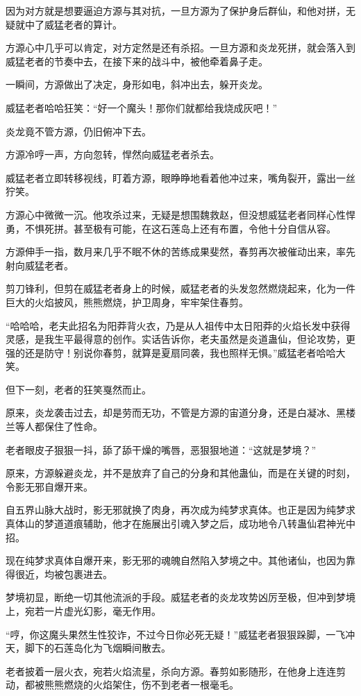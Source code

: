 \begin{this_body}
因为对方就是想要逼迫方源与其对抗，一旦方源为了保护身后群仙，和他对拼，无疑就中了威猛老者的算计。

方源心中几乎可以肯定，对方定然是还有杀招。一旦方源和炎龙死拼，就会落入到威猛老者的节奏中去，在接下来的战斗中，被他牵着鼻子走。

一瞬间，方源做出了决定，身形如电，斜冲出去，躲开炎龙。

威猛老者哈哈狂笑：“好一个魔头！那你们就都给我烧成灰吧！”

炎龙竟不管方源，仍旧俯冲下去。

方源冷哼一声，方向忽转，悍然向威猛老者杀去。

威猛老者立即转移视线，盯着方源，眼睁睁地看着他冲过来，嘴角裂开，露出一丝狞笑。

方源心中微微一沉。他攻杀过来，无疑是想围魏救赵，但没想威猛老者同样心性悍勇，不惧死拼。甚至极有可能，在这石莲岛上还有布置，令他十分自信从容。

方源伸手一指，数月来几乎不眠不休的苦练成果斐然，春剪再次被催动出来，率先射向威猛老者。

剪刀锋利，但剪在威猛老者身上的时候，威猛老者的头发忽然燃烧起来，化为一件巨大的火焰披风，熊熊燃烧，护卫周身，牢牢架住春剪。

“哈哈哈，老夫此招名为阳莽背火衣，乃是从人祖传中太日阳莽的火焰长发中获得灵感，是我生平最得意的创作。实话告诉你，老夫虽然是炎道蛊仙，但论攻势，更强的还是防守！别说你春剪，就算是夏扇同袭，我也照样无惧。”威猛老者哈哈大笑。

但下一刻，老者的狂笑戛然而止。

原来，炎龙袭击过去，却是劳而无功，不管是方源的宙道分身，还是白凝冰、黑楼兰等人都保住了性命。

老者眼皮子狠狠一抖，舔了舔干燥的嘴唇，恶狠狠地道：“这就是梦境？”

原来，方源躲避炎龙，并不是放弃了自己的分身和其他蛊仙，而是在关键的时刻，令影无邪自爆开来。

自五界山脉大战时，影无邪就换了肉身，再次成为纯梦求真体。也正是因为纯梦求真体山的梦道道痕辅助，他才在施展出引魂入梦之后，成功地令八转蛊仙君神光中招。

现在纯梦求真体自爆开来，影无邪的魂魄自然陷入梦境之中。其他诸仙，也因为靠得很近，均被包裹进去。

梦境初显，断绝一切其他流派的手段。威猛老者的炎龙攻势凶厉至极，但冲到梦境上，宛若一片虚光幻影，毫无作用。

“哼，你这魔头果然生性狡诈，不过今日你必死无疑！”威猛老者狠狠跺脚，一飞冲天，脚下的石莲岛化为飞烟瞬间散去。

老者披着一层火衣，宛若火焰流星，杀向方源。春剪如影随形，在他身上连连剪动，都被熊熊燃烧的火焰架住，伤不到老者一根毫毛。


\end{this_body}
